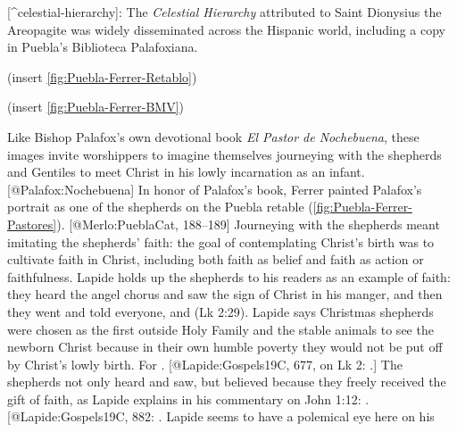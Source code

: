 [^celestial-hierarchy]:
The \emph{Celestial Hierarchy} attributed to Saint Dionysius the Areopagite was
widely disseminated across the Hispanic world, including a copy in Puebla's
Biblioteca Palafoxiana.

(insert \cref{fig:Puebla-Ferrer-Retablo})
\label{fig:Puebla-Ferrer-Retablo}

(insert \cref{fig:Puebla-Ferrer-BMV})
\label{fig:Puebla-Ferrer-BMV}

Like Bishop Palafox's own devotional book \emph{El Pastor de Nochebuena}, these
images invite worshippers to imagine themselves journeying with the shepherds
and Gentiles to meet Christ in his lowly incarnation as an infant.
[@Palafox:Nochebuena]
In honor of Palafox's book, Ferrer painted Palafox's portrait as one of the
shepherds on the Puebla retable (\cref{fig:Puebla-Ferrer-Pastores}).
[@Merlo:PueblaCat, 188--189]
Journeying with the shepherds meant imitating the shepherds' faith: the goal of
contemplating Christ's birth was to cultivate faith in Christ, including both
faith as belief and faith as action or faithfulness.
Lapide holds up the shepherds to his readers as an example of faith: they heard
the angel chorus and saw the sign of Christ in his manger, and then they went
and told everyone, and  (Lk 2:29).
Lapide says Christmas shepherds were chosen as the first outside Holy Family and
the stable animals to see the newborn Christ because in their own humble poverty
they would not be put off by Christ's lowly birth.
For . 
[@Lapide:Gospels19C, 677, on Lk 2: 
.]
The shepherds not only heard and saw, but believed because they freely received
the gift of faith, as Lapide explains in his commentary on John 1:12:
.
[@Lapide:Gospels19C, 882: 
. Lapide seems to have a polemical eye here on his
